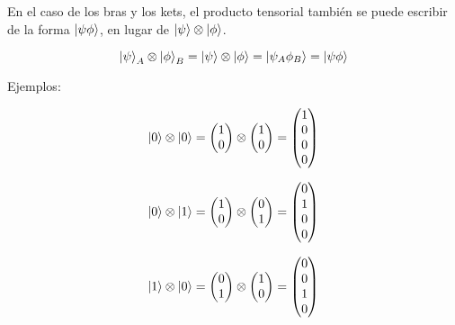 En el caso de los bras y los kets, el producto tensorial también se puede escribir de la forma $\ket{\psi\phi}$, en lugar de $\ket{\psi} \otimes \ket{\phi}$.


\begin{equation*}
    \ket{\psi}_A \otimes \ket{\phi}_B = \ket{\psi} \otimes \ket{\phi} = \ket{\psi_A \phi_B} = \ket{\psi\phi}
\end{equation*}

Ejemplos:

\begin{equation*}
    \ket{0} \otimes \ket{0}
    = \begin{pmatrix} 1\\0 \end{pmatrix} \otimes \begin{pmatrix} 1\\0 \end{pmatrix}
    = \begin{pmatrix} 1\\0\\0\\0 \end{pmatrix}
\end{equation*}

\begin{equation*}
    \ket{0} \otimes \ket{1}
    = \begin{pmatrix} 1\\0 \end{pmatrix} \otimes \begin{pmatrix} 0\\1 \end{pmatrix}
    = \begin{pmatrix} 0\\1\\0\\0 \end{pmatrix}
\end{equation*}

\begin{equation*}
    \ket{1} \otimes \ket{0}
    = \begin{pmatrix} 0\\1 \end{pmatrix} \otimes \begin{pmatrix} 1\\0 \end{pmatrix}
    = \begin{pmatrix} 0\\0\\1\\0 \end{pmatrix}
\end{equation*}

